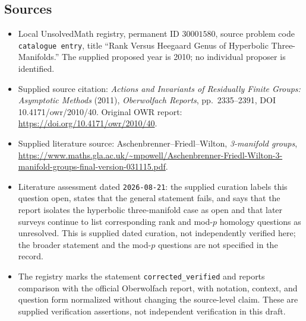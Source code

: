 \documentclass[11pt]{article}
\begin{document}
\subsection{Sources}
\begin{itemize}
\item Local UnsolvedMath registry, permanent ID \(30001580\), source problem code \texttt{catalogue entry}, title ``Rank Versus Heegaard Genus of Hyperbolic Three-Manifolds.'' The supplied proposed year is 2010; no individual proposer is identified.
\item Supplied source citation: \emph{Actions and Invariants of Residually Finite Groups: Asymptotic Methods} (2011), \emph{Oberwolfach Reports}, pp.\ 2335--2391, DOI 10.4171/owr/2010/40. Original OWR report: \url{https://doi.org/10.4171/owr/2010/40}.
\item Supplied literature source: Aschenbrenner--Friedl--Wilton, \emph{3-manifold groups}, \url{https://www.maths.gla.ac.uk/~mpowell/Aschenbrenner-Friedl-Wilton-3-manifold-groups-final-version-031115.pdf}.
\item Literature assessment dated \texttt{2026-08-21}: the supplied curation labels this question open, states that the general statement fails, and says that the report isolates the hyperbolic three-manifold case as open and that later surveys continue to list corresponding rank and mod-\(p\) homology questions as unresolved. This is supplied dated curation, not independently verified here; the broader statement and the mod-\(p\) questions are not specified in the record.
\item The registry marks the statement \texttt{corrected\_verified} and reports comparison with the official Oberwolfach report, with notation, context, and question form normalized without changing the source-level claim. These are supplied verification assertions, not independent verification in this draft.
\end{itemize}
\end{document}

